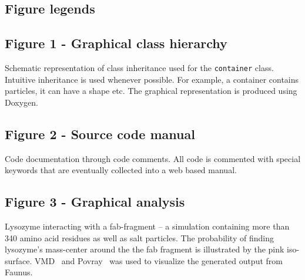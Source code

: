 \documentclass[10pt]{bmc_article}
\def\texttt{[image: ]}
\newenvironment{bmcformat}{\begin{raggedright}\baselineskip20pt\sloppy\setboolean{publ}{false}}{\end{raggedright}\baselineskip20pt\sloppy}
\begin{document}
\begin{bmcformat}




\section*{Figure legends}
  \subsection*{Figure 1 - Graphical class hierarchy}
      Schematic representation of class inheritance used for the
      \verb"container" class. Intuitive inheritance is used whenever possible.
      For example, a container contains particles, it can have a shape
      etc. The graphical representation is produced using Doxygen.
      \begin{figure}[ht]\center
      \label{fig:container}
      \end{figure}

  \subsection*{Figure 2 - Source code manual}
      Code documentation through code comments. All code is commented with
      special keywords that are eventually collected into a web based manual.
      \begin{figure}[ht]\center
      \label{fig:doxygen}
      \end{figure}

  \subsection*{Figure 3 - Graphical analysis}
     Lysozyme interacting with a fab-fragment -- a simulation containing
     more than 340 amino acid residues as well as salt particles.
     The probability of finding lysozyme's mass-center around
     the the fab fragment is illustrated by the pink iso-surface.
     VMD~\cite{vmd} and Povray~\cite{povray} was used to visualize the generated output from Faunus.
     \begin{figure}[ht]\center
           \label{fig:snapshot}
      \end{figure}


\end{bmcformat}
\end{document}

